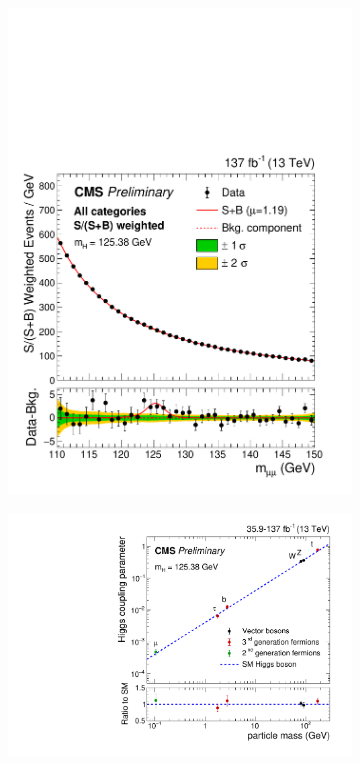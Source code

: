 \begin{figure}[htbp]
  \centering
  \begin{subfigure}[htbp]{0.48\textwidth}
    \centering
    \includegraphics[width=\textwidth]{figures_and_tables/theory/h_to_mumu_result.pdf}
    \caption{}
    \label{h_to_mumu_result}
  \end{subfigure}
  \hfill
  \begin{subfigure}[htbp]{0.48\textwidth}
    \centering
    \includegraphics[width=\textwidth]{figures_and_tables/theory/higgs_coups.pdf}

\end{subfigure}
\end{figure}
